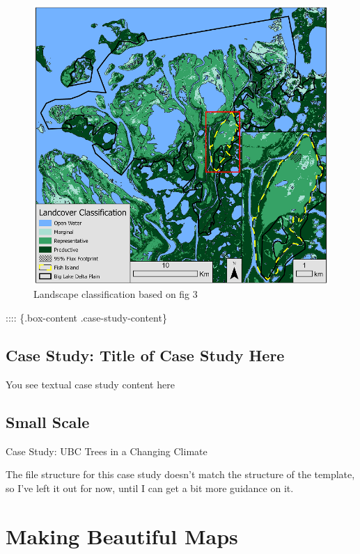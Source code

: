 \documentclass[
]{book}
\begin{document}
\begin{figure}
\centering
\includegraphics{images/16-fig6.png}
\caption{Landscape classification based on fig 3}
\end{figure}

:::: \{.box-content .case-study-content\}

\hypertarget{case-study-title-of-case-study-here-10}{%
\section{Case Study: Title of Case Study Here}\label{case-study-title-of-case-study-here-10}}

You see textual case study content here

\hypertarget{box-text}{%
\section*{Small Scale}\label{box-text}}

Case Study: UBC Trees in a Changing Climate

The file structure for this case study doesn't match the structure of the template, so I've left it out for now, until I can get a bit more guidance on it.

\hypertarget{making-beautiful-maps}{%
\chapter{Making Beautiful Maps}\label{making-beautiful-maps}}
\end{document}
